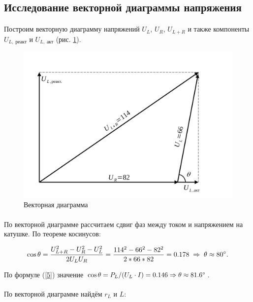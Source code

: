 \documentclass[a4paper,12pt]{article} %
\begin{document}
\subsection{Исследование векторной диаграммы напряжения}

\paragraph{} Построим векторную диаграмму напряжений $U_L$, $U_R$, $U_{L+R}$ и также компоненты $U_{L, \; \text{реакт}}$ и $U_{L, \; \text{акт}}$ (рис. \ref{fig:2}).

\begin{figure}[h]
\begin{center}
\includegraphics[width=\textwidth]{vector.png}
\caption{Векторная диаграмма}
\label{fig:2}
\end{center}
\end{figure}

\paragraph{} По векторной диаграмме рассчитаем сдвиг фаз между током и напряжением на катушке. По теореме косинусов:

\[ \cos \theta = \frac{U_{L+R}^2 - U_R^2 - U_L^2}{2U_L U_R} = \frac{114^2 - 66^2 - 82^2}{2 * 66 * 82} = 0.178 \; \Rightarrow \; \theta \approx 80 \degree.
\]

\noindent По формуле (\ref{5}) значение $\cos \theta = P_L/(U_L \cdot I) = 0.146 \Rightarrow \theta \approx 81.6 \degree$.

\paragraph{} По векторной диаграмме найдём $r_L$ и $L$:
\end{document}
